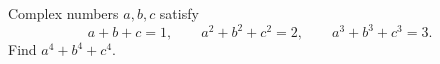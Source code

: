 Complex numbers $a,b,c$ satisfy
\[a+b+c=1,\qquad a^2+b^2+c^2=2,\qquad a^3+b^3+c^3=3.\]
Find $a^4+b^4+c^4$.
